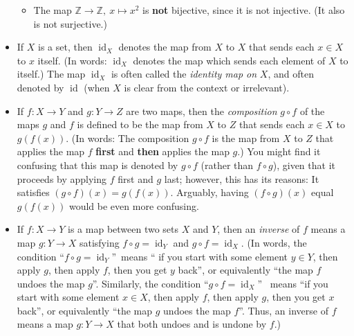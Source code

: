 \documentclass[numbers=enddot,12pt,final,onecolumn,notitlepage]{scrartcl}%
\theoremstyle{definition}
\begin{document}
\begin{itemize}
\begin{itemize}
\item The map $\mathbb{Z}\rightarrow\mathbb{Z},\ x\mapsto x^{2}$ is
\textbf{not} bijective, since it is not injective. (It also is not surjective.)
\end{itemize}

\item If $X$ is a set, then $\operatorname*{id}\nolimits_{X}$ denotes the map
from $X$ to $X$ that sends each $x\in X$ to $x$ itself. (In words:
$\operatorname*{id}\nolimits_{X}$ denotes the map which sends each element of
$X$ to itself.) The map $\operatorname*{id}\nolimits_{X}$ is often called the
\textit{identity map on }$X$, and often denoted by $\operatorname*{id}$ (when
$X$ is clear from the context or irrelevant).

\item If $f:X\rightarrow Y$ and $g:Y\rightarrow Z$ are two maps, then the
\textit{composition} $g\circ f$ of the maps $g$ and $f$ is defined to be the
map from $X$ to $Z$ that sends each $x\in X$ to $g\left(  f\left(  x\right)
\right)  $. (In words: The composition $g\circ f$ is the map from $X$ to $Z$
that applies the map $f$ \textbf{first} and \textbf{then} applies the map
$g$.) You might find it confusing that this map is denoted by $g\circ f$
(rather than $f\circ g$), given that it proceeds by applying $f$ first and $g$
last; however, this has its reasons: It satisfies $\left(  g\circ f\right)
\left(  x\right)  =g\left(  f\left(  x\right)  \right)  $. Arguably, having
$\left(  f\circ g\right)  \left(  x\right)  $ equal $g\left(  f\left(
x\right)  \right)  $ would be even more confusing.

\item If $f:X\rightarrow Y$ is a map between two sets $X$ and $Y$, then an
\textit{inverse} of $f$ means a map $g:Y\rightarrow X$ satisfying $f\circ
g=\operatorname*{id}\nolimits_{Y}$ and $g\circ f=\operatorname*{id}%
\nolimits_{X}$. (In words, the condition \textquotedblleft$f\circ
g=\operatorname*{id}\nolimits_{Y}$\textquotedblright\ means \textquotedblleft
if you start with some element $y\in Y$, then apply $g$, then apply $f$, then
you get $y$ back\textquotedblright, or equivalently \textquotedblleft the map
$f$ undoes the map $g$\textquotedblright. Similarly, the condition
\textquotedblleft$g\circ f=\operatorname*{id}\nolimits_{X}$\textquotedblright%
\ means \textquotedblleft if you start with some element $x\in X$, then apply
$f$, then apply $g$, then you get $x$ back\textquotedblright, or equivalently
\textquotedblleft the map $g$ undoes the map $f$\textquotedblright. Thus, an
inverse of $f$ means a map $g:Y\rightarrow X$ that both undoes and is undone
by $f$.)


\end{itemize}
\end{document}
